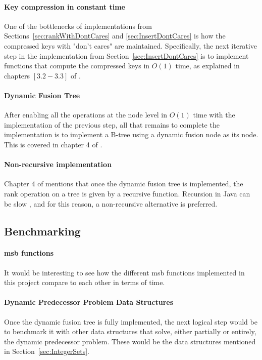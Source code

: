 \paragraph*{Key compression in constant time}
One of the bottlenecks of implementations from Sections~\ref{sec:rankWithDontCares} and \ref{sec:InsertDontCares} is how the compressed keys with "don't cares" are maintained. Specifically, the next iterative step in the implementation from Section~\ref{sec:InsertDontCares} is to implement functions that compute the compressed keys in $O(1)$ time, as explained in chapters $[3.2 - 3.3]$ of \cite{patrascu2014dynamic}.

\paragraph*{Dynamic Fusion Tree}
After enabling all the operations at the node level in $O(1)$ time with the implementation of the previous step, all that remains to complete the implementation is to implement a B-tree using a dynamic fusion node as its node. This is covered in chapter 4 of \cite{patrascu2014dynamic}.

\paragraph*{Non-recursive implementation}
Chapter 4 of \cite{patrascu2014dynamic} mentions that once the dynamic fusion tree is implemented, the rank operation on a tree is given by a recursive function. Recursion in Java can be slow \cite{shirazi2003java}, and for this reason, a non-recursive alternative is preferred.


\subsection{Benchmarking}

\paragraph*{msb functions}
It would be interesting to see how the different msb functions implemented in this project compare to each other in terms of time.

\paragraph*{Dynamic Predecessor Problem Data Structures}
Once the dynamic fusion tree is fully implemented, the next logical step would be to benchmark it with other data structures that solve, either partially or entirely, the dynamic predecessor problem. These would be the data structures mentioned in Section~\ref{sec:IntegerSets}.

